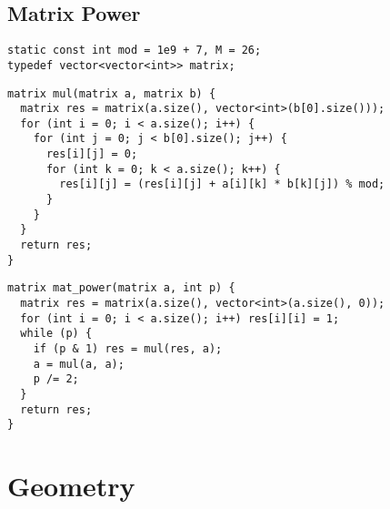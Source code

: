 \documentclass[twoside]{article}
\begin{document}
\begin{multicols*}{2}
{
\subsection*{Matrix Power}
}
\begin{verbatim}
static const int mod = 1e9 + 7, M = 26;
typedef vector<vector<int>> matrix;
\end{verbatim}
\vspace{-12pt}
\begin{verbatim}
matrix mul(matrix a, matrix b) {
  matrix res = matrix(a.size(), vector<int>(b[0].size()));
  for (int i = 0; i < a.size(); i++) {
    for (int j = 0; j < b[0].size(); j++) {
      res[i][j] = 0;
      for (int k = 0; k < a.size(); k++) {
        res[i][j] = (res[i][j] + a[i][k] * b[k][j]) % mod;
      }
    }
  }
  return res;
}
\end{verbatim}
\vspace{-12pt}
\begin{verbatim}
matrix mat_power(matrix a, int p) {
  matrix res = matrix(a.size(), vector<int>(a.size(), 0));
  for (int i = 0; i < a.size(); i++) res[i][i] = 1;
  while (p) {
    if (p & 1) res = mul(res, a);
    a = mul(a, a);
    p /= 2;
  }
  return res;
}

\end{verbatim}

{
\section*{Geometry}
}
{
}
\end{multicols*}
\end{document}
